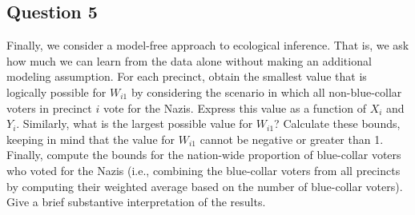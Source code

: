 \documentclass[]{article}
\begin{document}
\subsection{Question 5}\label{question-5}

Finally, we consider a model-free approach to ecological inference. That
is, we ask how much we can learn from the data alone without making an
additional modeling assumption. For each precinct, obtain the smallest
value that is logically possible for $W_{i1}$ by considering the
scenario in which all non-blue-collar voters in precinct $i$ vote for
the Nazis. Express this value as a function of $X_i$ and $Y_i$.
Similarly, what is the largest possible value for $W_{i1}$? Calculate
these bounds, keeping in mind that the value for $W_{i1}$ cannot be
negative or greater than 1. Finally, compute the bounds for the
nation-wide proportion of blue-collar voters who voted for the Nazis
(i.e., combining the blue-collar voters from all precincts by computing
their weighted average based on the number of blue-collar voters). Give
a brief substantive interpretation of the results.
\end{document}
